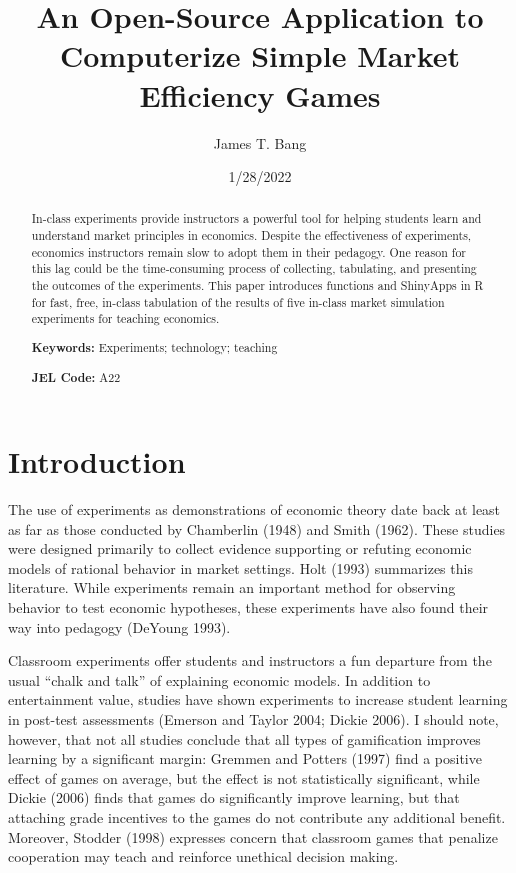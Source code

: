 \documentclass[
]{article}
\title{An Open-Source Application to Computerize Simple Market
Efficiency Games}
\author{James T. Bang}
\date{1/28/2022}
\begin{document}
\maketitle
\begin{abstract}
In-class experiments provide instructors a powerful tool for helping
students learn and understand market principles in economics. Despite
the effectiveness of experiments, economics instructors remain slow to
adopt them in their pedagogy. One reason for this lag could be the
time-consuming process of collecting, tabulating, and presenting the
outcomes of the experiments. This paper introduces functions and
ShinyApps in R for fast, free, in-class tabulation of the results of
five in-class market simulation experiments for teaching economics.

\textbf{Keywords:} Experiments; technology; teaching

\textbf{JEL Code:} A22
\end{abstract}

\newpage
{}
\setcounter{page}{1}

\hypertarget{introduction}{%
\section{Introduction}\label{introduction}}

The use of experiments as demonstrations of economic theory date back at
least as far as those conducted by Chamberlin (1948) and Smith (1962).
These studies were designed primarily to collect evidence supporting or
refuting economic models of rational behavior in market settings. Holt
(1993) summarizes this literature. While experiments remain an important
method for observing behavior to test economic hypotheses, these
experiments have also found their way into pedagogy (DeYoung 1993).

Classroom experiments offer students and instructors a fun departure
from the usual ``chalk and talk'' of explaining economic models. In
addition to entertainment value, studies have shown experiments to
increase student learning in post-test assessments (Emerson and Taylor
2004; Dickie 2006). I should note, however, that not all studies
conclude that all types of gamification improves learning by a
significant margin: Gremmen and Potters (1997) find a positive effect of
games on average, but the effect is not statistically significant, while
Dickie (2006) finds that games do significantly improve learning, but
that attaching grade incentives to the games do not contribute any
additional benefit. Moreover, Stodder (1998) expresses concern that
classroom games that penalize cooperation may teach and reinforce
unethical decision making.
\end{document}

